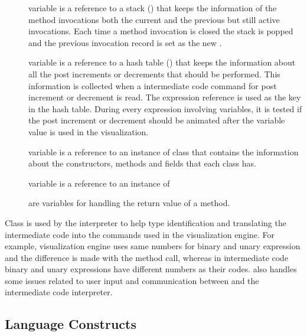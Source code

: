 \begin{description}
\item[] variable is a reference to a stack () that keeps the information of the method invocations both the current and the previous but still active invocations. Each time a method invocation is closed the stack is popped and the previous invocation record is set as the new .

\item[] variable is a reference to a hash table () that keeps the information about all the post increments or decrements that should be performed. This information is collected when a intermediate code command for post increment or decrement is read. The expression reference is used as the key in the hash table. During every expression involving variables, it is tested if the post increment or decrement should be animated after the variable value is used in the visualization.

\item[] variable is a reference to an instance of  class that contains the information about the constructors, methods and fields that each class has. 

\item[] variable is a reference to an instance of 

\item[]

\item[] are variables for handling the return value of a method.

\end{description}

Class  is used by the interpreter to help type identification and translating the intermediate code into the commands used in the visualization engine. For example, visualization engine uses same numbers for binary and unary expression and the difference is made with the method call, whereas in intermediate code binary and unary expressions have different numbers as their codes.  also handles some issues related to user input and communication between \djava{} and the intermediate code interpreter.

\subsection{Language Constructs}
\label{sec:Language_package}


